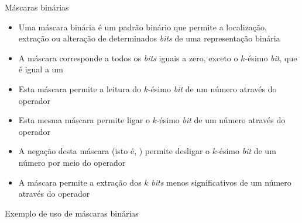 \begin{frame}[fragile]{Máscaras binárias}

    \begin{itemize}
        \item Uma máscara binária é um padrão binário que permite a localização, extração ou alteração de determinados \textit{bits} de uma representação binária

        \item A máscara  corresponde a todos os \textit{bits} iguais a zero, exceto o $k$-ésimo \textit{bit}, que é igual a um

        \item Esta máscara permite a leitura do $k$-ésimo \textit{bit} de um número através do operador 

        \item Esta mesma máscara permite ligar o $k$-ésimo \textit{bit} de um número através do operador 

        \item A negação desta máscara (isto é, ) permite desligar o $k$-ésimo \textit{bit} de um número por meio do operador 

        \item A máscara  permite a extração dos $k$ \textit{bits} menos significativos de um número através do operador 
    \end{itemize}

\end{frame}

\begin{frame}[fragile]{Exemplo de uso de máscaras binárias}
\end{frame}

